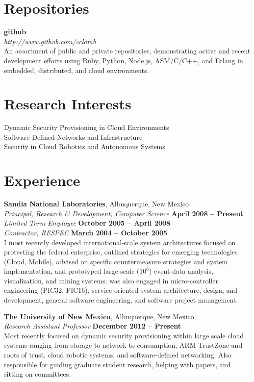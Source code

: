 \documentclass[margin,line]{resume}
\begin{document}
\begin{resume}
\section{\mysidestyle Repositories}
{\bf github} \vspace{2mm}  \\
{\sl http://www.github.com/cclamb} \vspace{1mm} \\
An assortment of public and private repositories, demonstrating active and recent development efforts using Ruby, Python, Node.js, ASM/C/C++, and Erlang in embedded, distributed, and cloud environments.

\section{\mysidestyle Research Interests}
Dynamic Security Provisioning in Cloud Environments \\
Software Defined Networks and Infrastructure \\
Security in Cloud Robotics and Autonomous Systems

\section{\mysidestyle Experience}
{\bf Sandia National Laboratories}, Albuquerque, New Mexico \vspace{2mm} \\
{\sl Principal, Research \& Development, Computer Science} \hfill \textbf{April 2008 -- Present} \\
{\sl Limited Term Employee} \hfill \textbf{October 2005 -- April 2008} \\\vspace{1mm}%
{\sl Contractor, RESPEC} \hfill \textbf{March 2004 -- October 2005} \\
I most recently developed international-scale system architectures focused on protecting the federal enterprise, outlined strategies for emerging technologies (Cloud, Mobile), advised on specific countermeasure strategies and system implementation, and prototyped large scale ($10^6$) event data analysis, visualization, and mining systems; was also engaged in micro-controller engineering (PIC32, PIC16), service-oriented system architecture, design, and development, general software engineering, and software project management.

{\bf The University of New Mexico}, Albuquerque, New Mexico \vspace{2mm} \\\vspace{1mm}%
{\sl Research Assistant Professor} \hfill \textbf{December 2012 -- Present} \\
Most recently focused on dynamic security provisioning within large scale cloud systems ranging from storage to network to consumption, ARM TrustZone and roots of trust, cloud robotic systems, and software-defined networking.  Also responsible for guiding graduate student research, helping with papers, and sitting on committees.


\end{resume}
\end{document}
